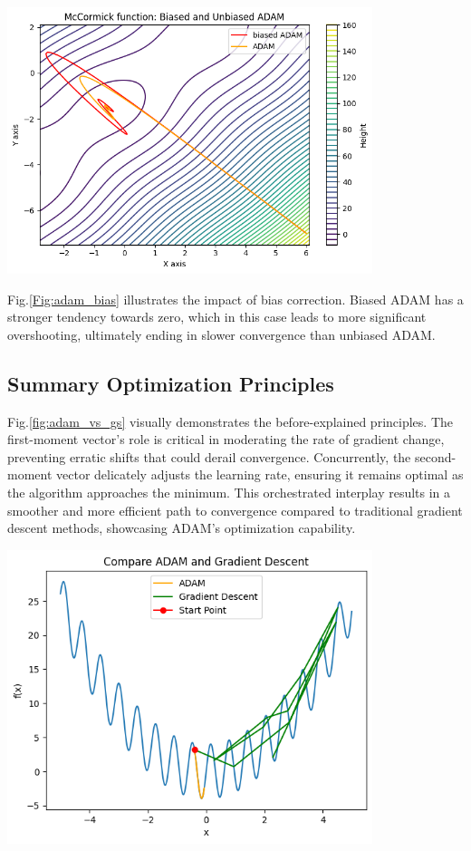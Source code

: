 \documentclass[oneside]{article}
\begin{document}
\begin{center}
    \includegraphics[width=0.8\textwidth]{report/figures/ADAM_bias.png}
    \label{Fig:adam_bias}
\end{center}
Fig.\ref{Fig:adam_bias} illustrates the impact of bias correction. Biased ADAM has a stronger tendency towards zero, which in this case leads to more significant overshooting, ultimately ending in slower convergence than unbiased ADAM.

\subsection{Summary Optimization Principles}
Fig.\ref{fig:adam_vs_gs} visually demonstrates the before-explained principles. The first-moment vector's role is critical in moderating the rate of gradient change, preventing erratic shifts that could derail convergence. Concurrently, the second-moment vector delicately adjusts the learning rate, ensuring it remains optimal as the algorithm approaches the minimum. This orchestrated interplay results in a smoother and more efficient path to convergence compared to traditional gradient descent methods, showcasing ADAM's optimization capability.
\begin{center}
    \includegraphics[width=0.8\textwidth]{report/figures/adam_vs_gradientdescent.png}
    \label{fig:adam_vs_gs}
\end{center}
\end{document}
